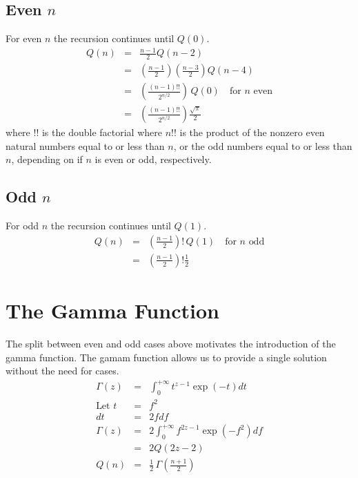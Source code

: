 \documentclass{article}
\begin{document}
\subsection{Even $ n $}
For even $ n $ the recursion continues until $ Q(0) $.
\begin{eqnarray}
Q(n) & = & \frac{n-1}{2} Q(n-2) \\
     & = & \left(\frac{n-1}{2}\right)\left( \frac{n-3}{2}\right) Q(n-4) \\
     & = & \left(\frac{(n-1)!!}{2^{n/2}}\right) \, Q(0) \quad \mbox{for } n \mbox{ even} \\
     & = &    \left(\frac{(n-1)!!}{2^{n/2}}\right) \frac{\sqrt{\pi}}{2} 
\end{eqnarray}
where $ !! $ is the double factorial where $ n !! $ is the product of the nonzero even natural numbers equal to or less than $ n $, or the odd numbers equal to or less than $ n $, depending on if $ n $ is even or odd, respectively.
\subsection{Odd $ n $}
For odd $ n $ the recursion continues until $ Q(1) $.
\begin{eqnarray}
Q(n) & = & \left(\frac{n-1}{2}\right)! \, Q(1) \quad \mbox{for } n \mbox{ odd} \\
     & = &    \left(\frac{n-1}{2}\right)! \frac{1}{2} 
\end{eqnarray}

\section{The Gamma Function}
The split between even and odd cases above motivates the introduction of the gamma function. The gamam function allows us to provide a single solution without the need for cases.
\begin{eqnarray}
\Gamma(z) & = & \int_0^{+\infty} t^{z-1} \exp(-t) dt \\
\mbox{Let } t & = & f^2 \\
dt & = & 2f df \\
\Gamma(z) & = & 2 \int_0^{+\infty} f^{2z-1} \exp(-f^2) df \\
& = & 2 Q(2z-2) \\
Q(n) & = & \frac{1}{2} \, \Gamma\left(\frac{n+1}{2}\right) 
\end{eqnarray}
\end{document}
